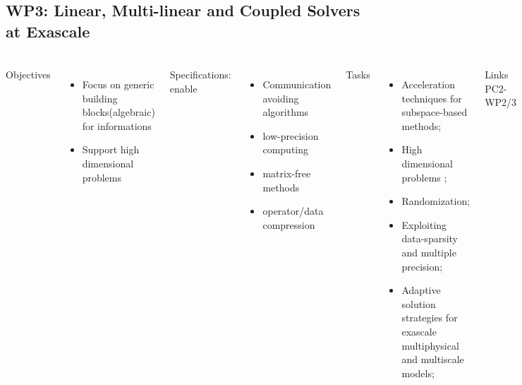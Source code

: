 \subsection{WP3: Linear, Multi-linear and Coupled Solvers at Exascale}
\begin{frame}
  \frametitle{\insertsectionhead}
  \framesubtitle{\insertsubsectionhead}
  \begin{columns}[t]
    Objectives
    \begin{itemize}
      \item Focus on generic building blocks(algebraic) for informations
      \item Support high dimensional problems
    \end{itemize}
    Specifications: enable
    \begin{itemize}
      \item Communication avoiding algorithms
      \item low-precision computing
      \item matrix-free methods
      \item operator/data compression
    \end{itemize}
    Tasks
    \begin{itemize}
      \item Acceleration techniques for subspace-based methods;
      \item High dimensional problems ;
      \item Randomization;
      \item Exploiting data-sparsity and multiple precision;
      \item Adaptive solution strategies for exascale multiphysical and multiscale models;
    \end{itemize}
    \begin{alertblock}{Links}
    PC2-WP2/3   
  \end{alertblock}
  \end{columns}
\end{frame}

